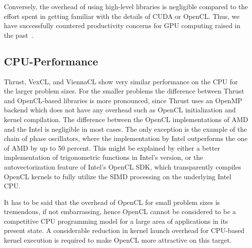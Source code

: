 \documentclass[final]{siamltex}
\begin{document}
Conversely, the overhead of using high-level libraries is negligible compared
to the effort spent in getting familiar with the details of CUDA or OpenCL.
Thus, we have successfully countered productivity concerns for GPU computing
raised in the past~\cite{bordawekar:gpu-productivity}.


\subsection{CPU-Performance}

Thrust, VexCL, and ViennaCL show very similar performance on the CPU for the
larger problem sizes. For the smaller problems the difference between Thrust
and OpenCL-based libraries is more pronounced, since Thrust uses an OpenMP backend
which does not have any overhead such as OpenCL initialization and kernel
compilation.  The difference between the OpenCL
implementations of AMD and the Intel is negligible in most cases. The only
exception is the example of the chain of phase oscillators, where the
implementation by Intel outperforms the one of AMD by up to 50 percent.  This
might be explained by either a better implementation of trigonometric functions
in Intel's version, or the autovectorization feature of Intel's OpenCL SDK,
which transparently compiles OpenCL kernels to fully utilize the SIMD
processing on the underlying Intel CPU.

It has to be said that the overhead of OpenCL for small problem sizes is
tremendous, if not embarrassing, hence OpenCL cannot be considered to be a
competitive CPU programming model for a large area of applications in its
present state. 
A considerable reduction in kernel launch overhead for CPU-based kernel execution is required to make OpenCL more attractive on this target.
\end{document}
